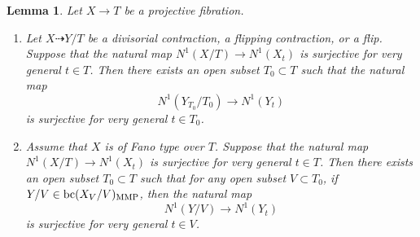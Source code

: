 \documentclass[11pt,oneside,reqno]{amsart}
\numberwithin{equation}{section}
\newtheorem{lemma}[proposition]{Lemma}
\theoremstyle{definition}
\newcommand{\bc}{{\rm {bc}}}
\begin{document}
\begin{lemma}\label{lem: surj preserved for bir contractions}
Let $X \to T$ be a projective fibration. 
\begin{enumerate}
    \item Let $X \dashrightarrow Y/T$ be a divisorial contraction, a flipping contraction, or a flip. Suppose that the natural map $N^1(X/T) \to N^1(X_t)$ is surjective for very general $t \in T$. Then there exists an open subset $T_0\subset T$ such that the natural map
\[
N^1(Y_{T_0}/T_0) \to N^1(Y_t)
\]
is surjective for very general $t \in T_0$.
    \item Assume that $X$ is of Fano type over $T$. Suppose that the natural map $N^1(X/T) \to N^1(X_t)$ is surjective for very general $t\in T$. Then there exists an open subset $T_0 \subset T$ such that for any open subset $V\subset T_0$, if $Y/V \in  \bc(X_V/V)_{\rm MMP}$, then the natural map
    \[
    N^1(Y/V) \to N^1(Y_t)
    \] is surjective for very general $t\in V$.
\end{enumerate}
\end{lemma}
\end{document}
